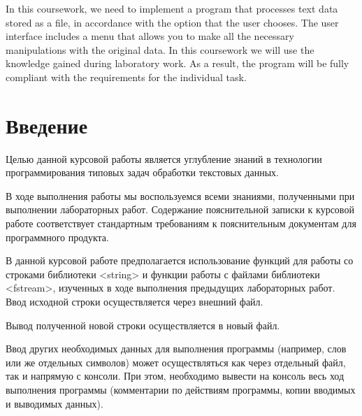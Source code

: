 \documentclass[12pt,a4paper]{article}%
\begin{document}
In this coursework, we need to implement a program that processes text data stored as a file, in accordance with the option that the user chooses. The user interface includes a menu that allows you to make all the necessary manipulations with the original data. In this coursework we will use the knowledge gained during laboratory work. As a result, the program will be fully compliant with the requirements for the individual task.

\newpage

\tableofcontents

\newpage

\section*{Введение}

Целью данной курсовой работы является углубление знаний в технологии программирования типовых задач
обработки текстовых данных.

В ходе выполнения работы мы воспользуемся всеми знаниями, полученными при выполнении лабораторных работ.
Содержание пояснительной записки к курсовой работе соответствует стандартным требованиям к пояснительным документам для программного продукта.

В данной курсовой работе предполагается использование функций для
работы со строками библиотеки <string> и функции работы с файлами библиотеки <fstream>,
изученных в ходе выполнения
предыдущих лабораторных работ.
Ввод исходной строки осуществляется через внешний файл. 

Вывод полученной новой строки осуществляется в новый файл. 

Ввод других необходимых данных для выполнения программы (например, слов или же
отдельных символов) может осуществляться как через отдельный файл, так и
напрямую с консоли. При этом, необходимо вывести на консоль весь ход
выполнения программы (комментарии по действиям программы, копии
вводимых и выводимых данных).
\end{document}

